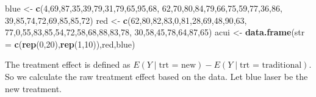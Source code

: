 \documentclass[
]{article}
\newenvironment{Shaded}{\begin{snugshade}}{\end{snugshade}}
\newcommand{\AttributeTok}[1]{\textcolor[rgb]{0.13,0.29,0.53}{#1}}
\newcommand{\DecValTok}[1]{\textcolor[rgb]{0.00,0.00,0.81}{#1}}
\newcommand{\FunctionTok}[1]{\textcolor[rgb]{0.13,0.29,0.53}{\textbf{#1}}}
\newcommand{\NormalTok}[1]{#1}
\newcommand{\OtherTok}[1]{\textcolor[rgb]{0.56,0.35,0.01}{#1}}
\begin{document}
\begin{Shaded}
\begin{Highlighting}[]
\NormalTok{blue }\OtherTok{\textless{}{-}} \FunctionTok{c}\NormalTok{(}\DecValTok{4}\NormalTok{,}\DecValTok{69}\NormalTok{,}\DecValTok{87}\NormalTok{,}\DecValTok{35}\NormalTok{,}\DecValTok{39}\NormalTok{,}\DecValTok{79}\NormalTok{,}\DecValTok{31}\NormalTok{,}\DecValTok{79}\NormalTok{,}\DecValTok{65}\NormalTok{,}\DecValTok{95}\NormalTok{,}\DecValTok{68}\NormalTok{,}
           \DecValTok{62}\NormalTok{,}\DecValTok{70}\NormalTok{,}\DecValTok{80}\NormalTok{,}\DecValTok{84}\NormalTok{,}\DecValTok{79}\NormalTok{,}\DecValTok{66}\NormalTok{,}\DecValTok{75}\NormalTok{,}\DecValTok{59}\NormalTok{,}\DecValTok{77}\NormalTok{,}\DecValTok{36}\NormalTok{,}\DecValTok{86}\NormalTok{,}
           \DecValTok{39}\NormalTok{,}\DecValTok{85}\NormalTok{,}\DecValTok{74}\NormalTok{,}\DecValTok{72}\NormalTok{,}\DecValTok{69}\NormalTok{,}\DecValTok{85}\NormalTok{,}\DecValTok{85}\NormalTok{,}\DecValTok{72}\NormalTok{)}
\NormalTok{red }\OtherTok{\textless{}{-}} \FunctionTok{c}\NormalTok{(}\DecValTok{62}\NormalTok{,}\DecValTok{80}\NormalTok{,}\DecValTok{82}\NormalTok{,}\DecValTok{83}\NormalTok{,}\DecValTok{0}\NormalTok{,}\DecValTok{81}\NormalTok{,}\DecValTok{28}\NormalTok{,}\DecValTok{69}\NormalTok{,}\DecValTok{48}\NormalTok{,}\DecValTok{90}\NormalTok{,}\DecValTok{63}\NormalTok{,}
        \DecValTok{77}\NormalTok{,}\DecValTok{0}\NormalTok{,}\DecValTok{55}\NormalTok{,}\DecValTok{83}\NormalTok{,}\DecValTok{85}\NormalTok{,}\DecValTok{54}\NormalTok{,}\DecValTok{72}\NormalTok{,}\DecValTok{58}\NormalTok{,}\DecValTok{68}\NormalTok{,}\DecValTok{88}\NormalTok{,}\DecValTok{83}\NormalTok{,}\DecValTok{78}\NormalTok{,}
        \DecValTok{30}\NormalTok{,}\DecValTok{58}\NormalTok{,}\DecValTok{45}\NormalTok{,}\DecValTok{78}\NormalTok{,}\DecValTok{64}\NormalTok{,}\DecValTok{87}\NormalTok{,}\DecValTok{65}\NormalTok{)}
\NormalTok{acui }\OtherTok{\textless{}{-}} \FunctionTok{data.frame}\NormalTok{(}\AttributeTok{str =} \FunctionTok{c}\NormalTok{(}\FunctionTok{rep}\NormalTok{(}\DecValTok{0}\NormalTok{,}\DecValTok{20}\NormalTok{),}\FunctionTok{rep}\NormalTok{(}\DecValTok{1}\NormalTok{,}\DecValTok{10}\NormalTok{)),red,blue)}
\end{Highlighting}
\end{Shaded}

The treatment effect is defined as
\(E(Y\mid \mbox{trt = new}) - E(Y\mid \mbox{trt = traditional})\). So we
calculate the raw treatment effect based on the data. Let blue laser be
the new treatment.
\end{document}
